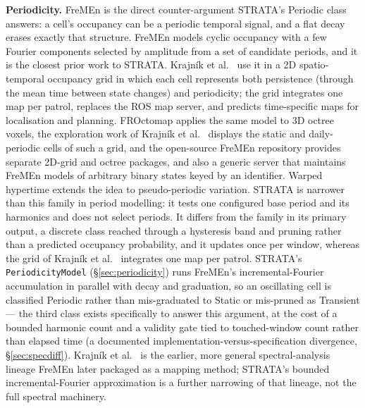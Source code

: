 \documentclass[conference]{IEEEtran}
\begin{document}
\textbf{Periodicity.} FreMEn \cite{krajnik2017fremen} is the direct counter-argument
STRATA's Periodic class answers: a cell's occupancy can be a periodic
temporal signal, and a flat decay erases exactly that structure. FreMEn
models cyclic occupancy with a few Fourier components selected by amplitude
from a set of candidate periods, and it is the closest prior work to STRATA.
Krajn\'ik et al.\ \cite{krajnik2016persistent} use it in a 2D spatio-temporal
occupancy grid in which each cell represents both persistence (through the
mean time between state changes) and periodicity; the grid integrates one map
per patrol, replaces the ROS map server, and predicts time-specific maps for
localisation and planning. FROctomap \cite{krajnik2014froctomap} applies the
same model to 3D octree voxels, the exploration work of Krajn\'ik et al.\
\cite{krajnik2015exploration} displays the static and daily-periodic cells of
such a grid, and the open-source FreMEn repository \cite{fremenrepo} provides
separate 2D-grid and octree packages, and also a generic server that maintains
FreMEn models of arbitrary binary states keyed by an identifier. Warped
hypertime \cite{krajnik2019warped} extends the idea to pseudo-periodic
variation. STRATA is narrower than this family in period modelling: it tests
one configured base period and its harmonics and does not select periods. It
differs from the family in its primary output, a discrete class reached
through a hysteresis band and pruning rather than a predicted occupancy
probability, and it updates once per window, whereas the grid of Krajn\'ik et
al.\ \cite{krajnik2016persistent} integrates one map per patrol. STRATA's
\texttt{PeriodicityModel} (\S\ref{sec:periodicity}) runs FreMEn's incremental-Fourier accumulation in
parallel with decay and graduation, so an oscillating cell is classified
Periodic rather than mis-graduated to Static or mis-pruned as Transient --- the
third class exists specifically to answer this argument, at the cost of a
bounded harmonic count and a validity gate tied to touched-window count
rather than elapsed time (a documented implementation-versus-specification
divergence, \S\ref{sec:specdiff}). Krajn\'ik et al.\
\cite{krajnik2014spectral} is the earlier, more general spectral-analysis
lineage FreMEn later packaged as a mapping method; STRATA's bounded
incremental-Fourier approximation is a further narrowing of that lineage, not
the full spectral machinery.
\end{document}

